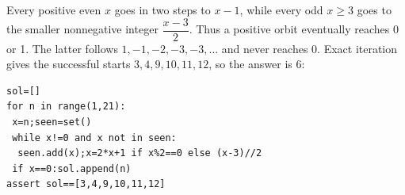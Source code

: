 Every positive even $ x $ goes in two steps to $ x-1 $, while every odd $ x\ge3 $ goes to the smaller nonnegative integer $\dfrac{x-3}{2}$. Thus a positive orbit eventually reaches 0 or 1. The latter follows $ 1,-1,-2,-3,-3,\ldots $ and never reaches 0. Exact iteration gives the successful starts $ 3,4,9,10,11,12 $, so the answer is $\boxed6 $:
\begin{verbatim}
sol=[]
for n in range(1,21):
 x=n;seen=set()
 while x!=0 and x not in seen:
  seen.add(x);x=2*x+1 if x%2==0 else (x-3)//2
 if x==0:sol.append(n)
assert sol==[3,4,9,10,11,12]
\end{verbatim}
